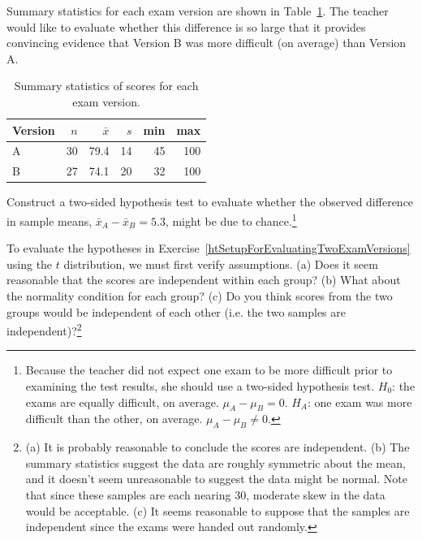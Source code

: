 
Summary statistics for each exam version are shown in Table~\ref{summaryStatsForTwoVersionsOfExams}. The teacher would like to evaluate whether this difference is so large that it provides convincing evidence that Version B was more difficult (on average) than Version A. 

\begin{table}[hht]
\centering
\begin{tabular}{l rrrrr}
\hline
Version\hspace{2mm}	& $n$	& $\bar{x}$	& $s$	& min	& max  \\
\hline
A		& 30		& 79.4		& 14 	& 45		& 100 \\
B		& 27		& 74.1		& 20		& 32		& 100 \\
\hline
\end{tabular}
\caption{Summary statistics of scores for each exam version.}
\label{summaryStatsForTwoVersionsOfExams}
\end{table}

\begin{exercise} \label{htSetupForEvaluatingTwoExamVersions}
Construct a two-sided hypothesis test to evaluate whether the observed difference in sample means, $\bar{x}_A - \bar{x}_B=5.3$, might be due to chance.\footnote{Because the teacher did not expect one exam to be more difficult prior to examining the test results, she should use a two-sided hypothesis test. $H_0$: the exams are equally difficult, on average. $\mu_A - \mu_B = 0$. $H_A$: one exam was more difficult than the other, on average. $\mu_A - \mu_B \neq 0$.}
\end{exercise}

\begin{exercise} \label{conditionsForTDistForEvaluatingTwoExamVersions}
To evaluate the hypotheses in Exercise~\ref{htSetupForEvaluatingTwoExamVersions} using the $t$ distribution, we must first verify assumptions. (a) Does it seem reasonable that the scores are independent within each group? (b) What about the normality condition for each group? (c) Do you think scores from the two groups would be independent of each other (i.e. the two samples are independent)?\footnote{(a) It is probably reasonable to conclude the scores are independent. (b) The summary statistics suggest the data are roughly symmetric about the mean, and it doesn't seem unreasonable to suggest the data might be normal. Note that since these samples are each nearing 30, moderate skew in the data would be acceptable. (c) It seems reasonable to suppose that the samples are independent since the exams were handed out randomly.}
\end{exercise}


